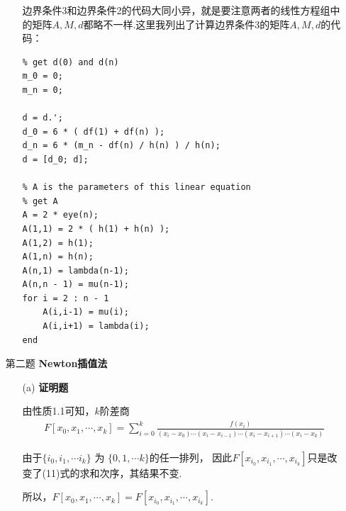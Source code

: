 \documentclass[12pt,a4paper,utf8]{ctexart}
\begin{document}
\begin{enumerate}
\begin{itemize}
    \par
    边界条件3和边界条件2的代码大同小异，就是要注意两者的线性方程组中的矩阵$A,M,d$都略不一样.这里我列出了计算边界条件3的矩阵$A,M,d$的代码：
    \begin{lstlisting}[frame=single]
% for boundary condition 3,
% get d(0) and d(n)
m_0 = 0;
m_n = 0;
    
d = d.';
d_0 = 6 * ( df(1) + df(n) );
d_n = 6 * (m_n - df(n) / h(n) ) / h(n);
d = [d_0; d];

% A is the parameters of this linear equation
% get A
A = 2 * eye(n);
A(1,1) = 2 * ( h(1) + h(n) );
A(1,2) = h(1);
A(1,n) = h(n);
A(n,1) = lambda(n-1);
A(n,n - 1) = mu(n-1);
for i = 2 : n - 1
    A(i,i-1) = mu(i);
    A(i,i+1) = lambda(i);
end
    \end{lstlisting}
    \end{itemize}
    
\item[第二题] \textbf{Newton插值法}

\begin{itemize}
  \item [(a)] \textbf{证明题} 
  \par
  由性质1.1可知，$k$阶差商
  \begin{equation}
    \begin{aligned}
    F[x_0,x_1, \cdots,x_k] = \sum_{i=0}^k 
    \frac{f(x_i)}{(x_i - x_0)\cdots(x_i - x_{i-1})\cdots(x_i - x_{i+1}) \cdots (x_i - x_k)}
    \end{aligned}
  \end{equation}

  \par
  由于$\{i_0,i_1, \cdots i_k\}$ 为 $\{ 0,1, \cdots k\}$的任一排列，
  因此$F[x_{i_0},x_{i_1}, \cdots,x_{i_k}]$只是改变了(11)式的求和次序，其结果不变.
  \par
  所以，$F[x_0,x_1, \cdots,x_k] = F[x_{i_0},x_{i_1}, \cdots,x_{i_k}]$.


\end{itemize}
\end{enumerate}
\end{document}
